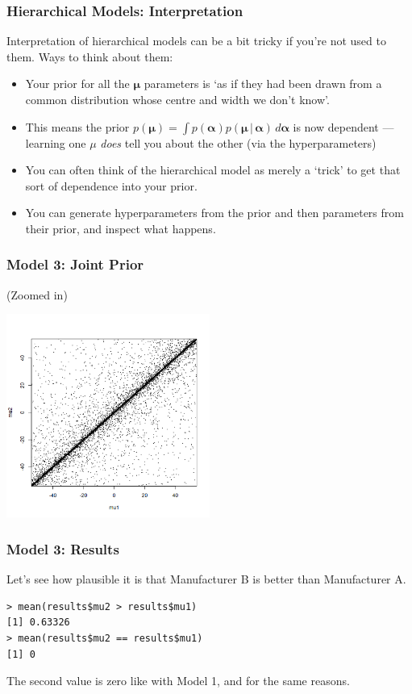 \documentclass{beamer}
\newcommand{\given}{\,|\,}
\newcommand{\balpha}{\boldsymbol{\alpha}}
\newcommand{\bmu}{\boldsymbol{\mu}}
\begin{document}
\begin{frame}[fragile]
\frametitle{Hierarchical Models: Interpretation}
\footnotesize
Interpretation of hierarchical models can be a bit tricky if you're not used
to them. Ways to think about them: \pause
\begin{itemize}
\item Your prior for all the $\bmu$ parameters is `as if they had been
      drawn from a common distribution
      whose centre and width we don't know'.\pause
\item This means the prior $p(\bmu) = \int p(\balpha) p(\bmu \given \balpha) \, d\balpha$
      is now dependent --- learning one $\mu$ {\em does} tell you about the
      other (via the hyperparameters)\pause
\item You can often think of the hierarchical model as merely a `trick' to
      get that sort of dependence into your prior.\pause
\item You can generate hyperparameters from the prior and then parameters
      from their prior, and inspect what happens.
\end{itemize}

\end{frame}


\begin{frame}[fragile]
\frametitle{Model 3: Joint Prior}
(Zoomed in)
\begin{center}
\includegraphics[width=0.5\textwidth]{images/ttest_prior3.png}
\end{center}

\end{frame}


\begin{frame}[fragile]
\frametitle{Model 3: Results}
Let's see how plausible it is that Manufacturer B is better than Manufacturer
A.

\begin{verbatim}
> mean(results$mu2 > results$mu1)
[1] 0.63326
> mean(results$mu2 == results$mu1)
[1] 0
\end{verbatim}
\pause

The second value is zero like with Model 1, and for the same reasons.

\end{frame}
\end{document}
